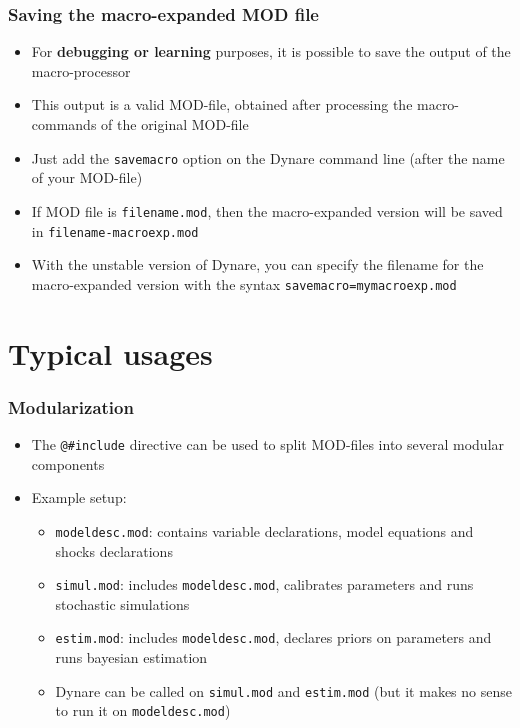 \documentclass{beamer}
\begin{document}
\begin{frame}
  \frametitle{Saving the macro-expanded MOD file}
  \begin{itemize}
  \item For \textbf{debugging or learning} purposes, it is possible to save the output of the macro-processor
  \item This output is a valid MOD-file, obtained after processing the macro-commands of the original MOD-file
  \item Just add the \texttt{savemacro} option on the Dynare command line (after the name of your MOD-file)
  \item If MOD file is \texttt{filename.mod}, then the macro-expanded version will be saved in \texttt{filename-macroexp.mod}
  \item With the unstable version of Dynare, you can specify the filename for the macro-expanded version with the syntax \texttt{savemacro=mymacroexp.mod}
  \end{itemize}
\end{frame}


\section{Typical usages}

\begin{frame}[fragile=singleslide]
  \frametitle{Modularization}
  \begin{itemize}
  \item The \verb+@#include+ directive can be used to split MOD-files into several modular components
  \item Example setup:
    \begin{itemize}
    \item \texttt{modeldesc.mod}: contains variable declarations, model equations and shocks declarations
    \item \texttt{simul.mod}: includes \texttt{modeldesc.mod}, calibrates parameters and runs stochastic simulations
    \item \texttt{estim.mod}: includes \texttt{modeldesc.mod}, declares priors on parameters and runs bayesian estimation
    \item Dynare can be called on \texttt{simul.mod} and \texttt{estim.mod} (but it makes no sense to run it on \texttt{modeldesc.mod})
    \end{itemize}
  \end{itemize}
\end{frame}
\end{document}
